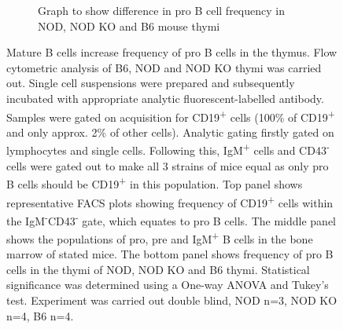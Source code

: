 \begin{figure}
\begin{subfigure}{\textwidth}
	\caption{Graph to show difference in pro B cell frequency in NOD, NOD KO and B6 mouse thymi}
	\label{subfig:MatureBincproBgraph}
	\end{subfigure}
\caption[NOD mice have an increased frequency of pro B cells compared to NOD KO thymi]{Mature B cells increase frequency of pro B cells in the thymus.
Flow cytometric analysis of B6, NOD and NOD KO thymi was carried out.
Single cell suspensions were prepared and subsequently incubated with appropriate analytic fluorescent-labelled antibody.
Samples were gated on acquisition for CD19\textsuperscript{+} cells (100\% of CD19\textsuperscript{+} and only approx. 2\% of other cells).
Analytic gating firstly gated on lymphocytes and single cells.
Following this, IgM\textsuperscript{+} cells and CD43\textsuperscript{-} cells were gated out to make all 3 strains of mice equal as only pro B cells should be CD19\textsuperscript{+} in this population. 
Top panel shows representative FACS plots showing frequency of CD19\textsuperscript{+} cells within the IgM\textsuperscript{-}CD43\textsuperscript{-} gate, which equates to pro B cells.
The middle panel shows the populations of pro, pre and IgM\textsuperscript{+} B cells in the bone marrow of stated mice.
The bottom panel shows frequency of pro B cells in the thymi of NOD, NOD KO and B6 thymi.
Statistical significance was determined using a One-way ANOVA and Tukey's test. 
Experiment was carried out double blind, NOD n=3, NOD KO n=4, B6 n=4.}
\label{fig:MatureBincProB}
\end{figure}




